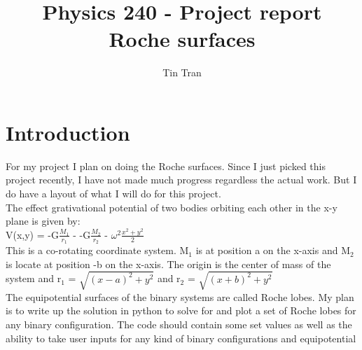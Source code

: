 \documentclass{article}
\begin{document}
\title{Physics 240 - Project report\\
		Roche surfaces}
\author{Tin Tran}

\maketitle

\section{Introduction}
For my project I plan on doing the Roche surfaces. Since I just picked this project recently, I have not made much progress regardless the actual work. But I do have a layout of what I will do for this project.\\
The effect grativational potential of two bodies orbiting each other in the x-y plane is given by:\\
V(x,y) = -G$\frac{M_1}{r_1}$ - -G$\frac{M_2}{r_2}$ - $\omega^2\frac{x^2+y^2}{2}$\\
This is a co-rotating coordinate system. M$_1$ is at position a on the x-axis and M$_2$ is locate at position -b on the x-axis. The origin is the center of mass of the system and r$_1$ = $\sqrt{(x-a)^2+y^2}$ and r$_2$ = $\sqrt{(x+b)^2+y^2}$\\
The equipotential surfaces of the binary systems are called Roche lobes. My plan is to write up the solution in python to solve for and plot a set of Roche lobes for any binary configuration. The code should contain some set values as well as the ability to take user inputs for any kind of binary configurations and equipotential 
\end{document}
